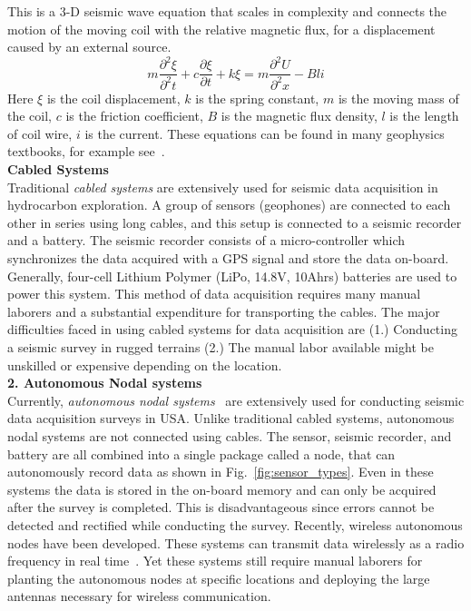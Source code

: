  This is a $3$-D seismic wave equation that scales in complexity and connects the motion of the moving coil with the relative magnetic flux, for a displacement caused by an external source.
\begin{equation}
m\frac{\partial^{2}{\xi}}{\partial^{2}{t}}+c\frac{\partial{\xi}}{\partial{t}}+k\xi = m\frac{\partial^{2}{U}}{\partial^{2}{x}}-Bli
\end{equation} 
Here $\xi$ is the coil displacement, $k$ is the spring constant, $m$ is the moving mass of the coil, $c$ is the friction coefficient, $B$ is the magnetic flux density, $l$ is the length of coil wire, $i$ is the current. These equations can be found in many geophysics textbooks, for example see~\cite{shearer2009introduction}.
\\
 \textbf{Cabled Systems}\\
 Traditional \emph{cabled systems} are extensively used for seismic data acquisition in hydrocarbon exploration. A group of sensors (geophones) are connected to each other in series using long cables, and this setup is connected to a seismic recorder and a battery. The seismic recorder consists of a micro-controller which synchronizes the data acquired with a GPS signal and store the data on-board. Generally, four-cell Lithium Polymer (LiPo, 14.8V, 10Ahrs) batteries are used to power this system. This method of data acquisition requires many manual laborers and a substantial expenditure for transporting the cables. The major difficulties faced in using cabled systems for data acquisition are (1.) Conducting a seismic survey in rugged terrains (2.) The manual labor available might be unskilled or expensive depending on the location.  
\\
 \textbf{2. Autonomous Nodal systems}\\
 Currently, \emph{autonomous nodal systems}~\cite{wood1998distributed} are extensively used for conducting seismic data acquisition surveys in USA. Unlike traditional cabled systems, autonomous nodal systems are not connected using cables. The sensor, seismic recorder, and battery are all combined into a single package called a node, that can autonomously record data as shown in Fig.~\ref{fig:sensor_types}. Even in these systems the data is stored in the on-board memory and can only be acquired after the survey is completed. This is disadvantageous since errors cannot be detected and rectified while conducting the survey. Recently, wireless autonomous nodes have been developed. These systems can transmit data wirelessly as a radio frequency in real time~\cite{jiang2015geophysical}. Yet these systems still require manual laborers for planting the autonomous nodes at specific locations and deploying the large antennas necessary for wireless communication.
